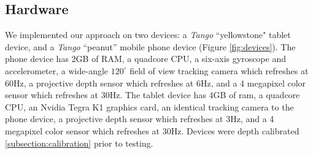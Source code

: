 \documentclass[conference,10pt]{IEEEtran}
\begin{document}
\subsection{Hardware}
We implemented our approach on two devices: a \textit{Tango}
``yellowstone" tablet device, and a \textit{Tango} ``peanut'' mobile phone
device (Figure \ref{fig:devices}). The phone device has 2GB of RAM, a quadcore
CPU, a six-axis gyroscope and accelerometer, a wide-angle $120^\circ$ field of
view tracking camera which refreshes at 60Hz, a projective depth sensor which
refreshes at 6Hz, and a 4 megapixel color sensor which refreshes at 30Hz. The
tablet device has 4GB of ram, a quadcore CPU, an Nvidia Tegra K1 graphics card,
an identical tracking camera to the phone device, a projective depth sensor
which refreshes at 3Hz, and a 4 megapixel color sensor which refreshes at 30Hz.
Devices were depth calibrated \ref{subsection:calibration} prior to testing.
\end{document}
